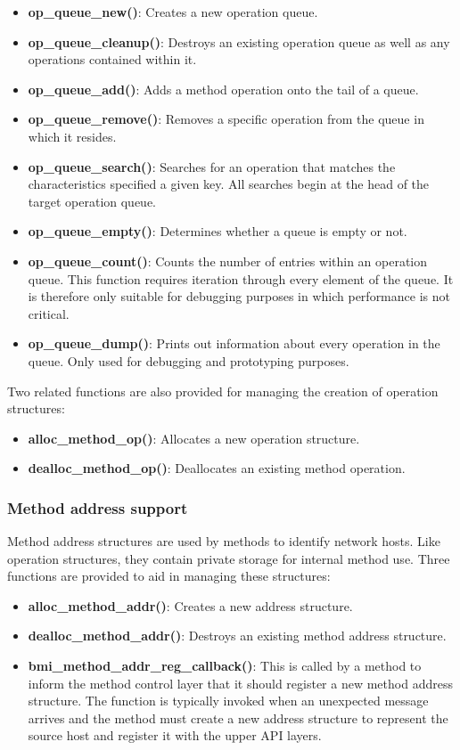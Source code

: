 \documentclass[11pt]{article}
\begin{document}
\begin{itemize}
\item \textbf{op\_queue\_new()}: Creates a new operation queue.
\item \textbf{op\_queue\_cleanup()}:  Destroys an existing
operation queue as well as any operations contained within it.
\item \textbf{op\_queue\_add()}:  Adds a
method operation onto the tail of a queue.
\item \textbf{op\_queue\_remove()}:  Removes a specific
operation from the queue in which it resides.
\item \textbf{op\_queue\_search()}:  Searches for
an operation that matches the characteristics specified a given key.  All
searches begin at the head of the target operation queue.
\item \textbf{op\_queue\_empty()}: Determines whether a
queue is empty or not.
\item \textbf{op\_queue\_count()}: Counts the number of
entries within an operation queue.  This function requires iteration
through every element of the queue.  It is therefore only suitable for
debugging purposes in which performance is not critical.
\item \textbf{op\_queue\_dump()}: Prints out
information about every operation in the queue.  Only used for debugging
and prototyping purposes.
\end{itemize}

Two related functions are also provided for managing the creation of
operation structures:

\begin{itemize}
\item \textbf{alloc\_method\_op()}:  Allocates a new
operation structure.
\item \textbf{dealloc\_method\_op()}: Deallocates an existing
method operation.
\end{itemize}

\subsubsection{Method address support}

Method address structures are used by methods to identify network hosts.
Like operation structures, they contain private storage for internal
method use.  Three functions are provided to aid in managing these
structures:

\begin{itemize}
\item \textbf{alloc\_method\_addr()}:  Creates
a new address structure.  
\item \textbf{dealloc\_method\_addr()}:  Destroys an
existing method address structure.
\item \textbf{bmi\_method\_addr\_reg\_callback()}:
This is called by a method to inform the method control layer that it
should register a new method address structure.  The function is
typically invoked when an unexpected message arrives and the method must
create a new address structure to represent the source
host and register it with the upper API layers.  
\end{itemize}
\end{document}
